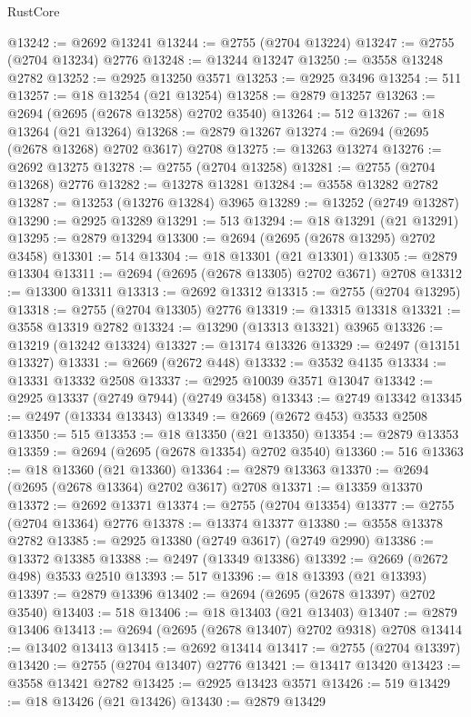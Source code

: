 \begin{lexlean}{RustCore}
\begin{coremodule}
@13242 := @2692 @13241
@13244 := @2755 (@2704 @13224)
@13247 := @2755 (@2704 @13234) @2776
@13248 := @13244 @13247
@13250 := @3558 @13248 @2782
@13252 := @2925 @13250 @3571
@13253 := @2925 @3496
@13254 := 511
@13257 := @18 @13254 (@21 @13254)
@13258 := @2879 @13257
@13263 := @2694 (@2695 (@2678 @13258) @2702 @3540)
@13264 := 512
@13267 := @18 @13264 (@21 @13264)
@13268 := @2879 @13267
@13274 := @2694 (@2695 (@2678 @13268) @2702 @3617) @2708
@13275 := @13263 @13274
@13276 := @2692 @13275
@13278 := @2755 (@2704 @13258)
@13281 := @2755 (@2704 @13268) @2776
@13282 := @13278 @13281
@13284 := @3558 @13282 @2782
@13287 := @13253 (@13276 @13284) @3965
@13289 := @13252 (@2749 @13287)
@13290 := @2925 @13289
@13291 := 513
@13294 := @18 @13291 (@21 @13291)
@13295 := @2879 @13294
@13300 := @2694 (@2695 (@2678 @13295) @2702 @3458)
@13301 := 514
@13304 := @18 @13301 (@21 @13301)
@13305 := @2879 @13304
@13311 := @2694 (@2695 (@2678 @13305) @2702 @3671) @2708
@13312 := @13300 @13311
@13313 := @2692 @13312
@13315 := @2755 (@2704 @13295)
@13318 := @2755 (@2704 @13305) @2776
@13319 := @13315 @13318
@13321 := @3558 @13319 @2782
@13324 := @13290 (@13313 @13321) @3965
@13326 := @13219 (@13242 @13324)
@13327 := @13174 @13326
@13329 := @2497 (@13151 @13327)
@13331 := @2669 (@2672 @448)
@13332 := @3532 @4135
@13334 := @13331 @13332 @2508
@13337 := @2925 @10039 @3571 @13047
@13342 := @2925 @13337 (@2749 @7944) (@2749 @3458)
@13343 := @2749 @13342
@13345 := @2497 (@13334 @13343)
@13349 := @2669 (@2672 @453) @3533 @2508
@13350 := 515
@13353 := @18 @13350 (@21 @13350)
@13354 := @2879 @13353
@13359 := @2694 (@2695 (@2678 @13354) @2702 @3540)
@13360 := 516
@13363 := @18 @13360 (@21 @13360)
@13364 := @2879 @13363
@13370 := @2694 (@2695 (@2678 @13364) @2702 @3617) @2708
@13371 := @13359 @13370
@13372 := @2692 @13371
@13374 := @2755 (@2704 @13354)
@13377 := @2755 (@2704 @13364) @2776
@13378 := @13374 @13377
@13380 := @3558 @13378 @2782
@13385 := @2925 @13380 (@2749 @3617) (@2749 @2990)
@13386 := @13372 @13385
@13388 := @2497 (@13349 @13386)
@13392 := @2669 (@2672 @498) @3533 @2510
@13393 := 517
@13396 := @18 @13393 (@21 @13393)
@13397 := @2879 @13396
@13402 := @2694 (@2695 (@2678 @13397) @2702 @3540)
@13403 := 518
@13406 := @18 @13403 (@21 @13403)
@13407 := @2879 @13406
@13413 := @2694 (@2695 (@2678 @13407) @2702 @9318) @2708
@13414 := @13402 @13413
@13415 := @2692 @13414
@13417 := @2755 (@2704 @13397)
@13420 := @2755 (@2704 @13407) @2776
@13421 := @13417 @13420
@13423 := @3558 @13421 @2782
@13425 := @2925 @13423 @3571
@13426 := 519
@13429 := @18 @13426 (@21 @13426)
@13430 := @2879 @13429

\end{coremodule}
\end{lexlean}

